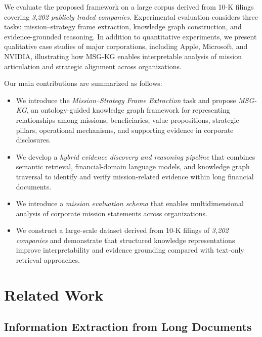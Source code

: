 \documentclass[11pt]{article}
\begin{document}
We evaluate the proposed framework on a large corpus derived from 10-K filings covering \textit{3,202 publicly traded companies}. Experimental evaluation considers three tasks: mission--strategy frame extraction, knowledge graph construction, and evidence-grounded reasoning. In addition to quantitative experiments, we present qualitative case studies of major corporations, including Apple, Microsoft, and NVIDIA, illustrating how MSG-KG enables interpretable analysis of mission articulation and strategic alignment across organizations.

Our main contributions are summarized as follows:

\begin{itemize}[leftmargin=1.0em, itemsep=0.05em, topsep=0.05em]

\item We introduce the \textit{Mission--Strategy Frame Extraction} task and propose \textit{MSG-KG}, an ontology-guided knowledge graph framework for representing relationships among missions, beneficiaries, value propositions, strategic pillars, operational mechanisms, and supporting evidence in corporate disclosures.

\item We develop a \textit{hybrid evidence discovery and reasoning pipeline} that combines semantic retrieval, financial-domain language models, and knowledge graph traversal to identify and verify mission-related evidence within long financial documents.

\item We introduce a \textit{mission evaluation schema} that enables multidimensional analysis of corporate mission statements across organizations.

\item We construct a large-scale dataset derived from 10-K filings of \textit{3,202 companies} and demonstrate that structured knowledge representations improve interpretability and evidence grounding compared with text-only retrieval approaches.

\end{itemize}


\section{Related Work}

\subsection{Information Extraction from Long Documents}
\end{document}
